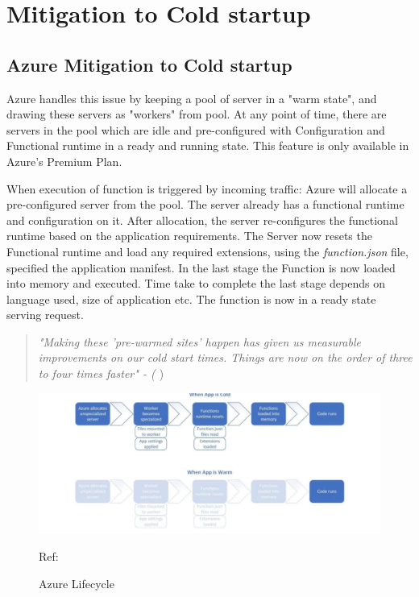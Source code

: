 \documentclass{article}
\begin{document}
\section{Mitigation to Cold startup}

\subsection{ Azure Mitigation to Cold startup}
\begin{flushleft}
Azure handles this issue by keeping a pool of server in a "warm state", and drawing these servers as "workers" from pool. At any point of time, there are servers in the pool which are idle and pre-configured with Configuration and Functional runtime in a ready and running state. This feature is only available in Azure's Premium Plan.
\end{flushleft}

When execution of function is triggered by incoming traffic:
\newline
Azure will allocate a pre-configured server from the pool. The server already has a functional runtime and configuration on it.
\newline
After allocation, the server re-configures the functional runtime based on the application requirements.
\newline
The Server now resets the Functional runtime and load any required extensions, using the \textit{function.json} file, specified the application manifest.
\newline
In the last stage the Function is now loaded into memory and executed. Time take to complete the last stage depends on language used, size of application etc. The function is now in a ready state serving request.
\par
\begin{flushright}    
\begin{quote}
    \textit{"Making these 'pre-warmed sites' happen has given us measurable improvements on our cold start times. Things are now on the order of three to four times faster" 
 - ( \cite{Understanding_serverless_cold_start_2018} } )
\end{quote}
 \end{flushright}

\begin{figure}[h]
    \centering
    \includegraphics[width=1.0\linewidth]{images/Azure_lifecycle.PNG}
    \caption{Azure Lifecycle}
        Ref: \cite{Understanding_serverless_cold_start_2018}
\end{figure}
\end{document}
